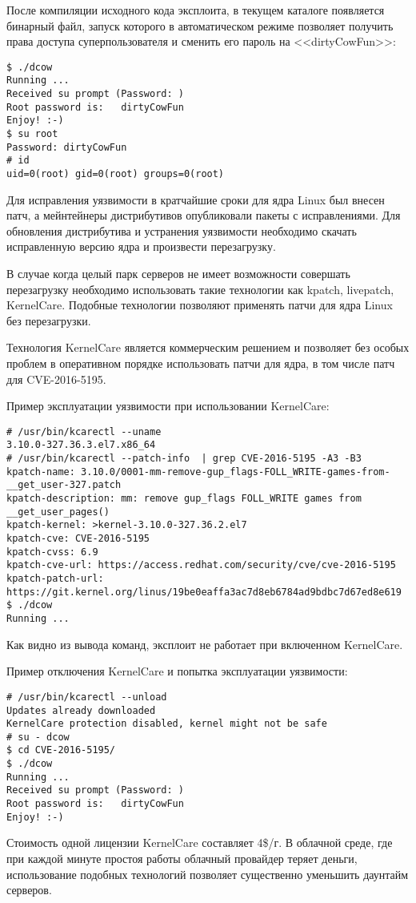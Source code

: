 После компиляции исходного кода эксплоита, в текущем каталоге появляется бинарный файл, запуск которого в автоматическом режиме позволяет получить права доступа суперпользователя и сменить его пароль на <<dirtyCowFun>>:
\begin{lstlisting}
$ ./dcow
Running ...
Received su prompt (Password: )
Root password is:   dirtyCowFun
Enjoy! :-)
$ su root
Password: dirtyCowFun
# id
uid=0(root) gid=0(root) groups=0(root)
\end{lstlisting}

Для исправления уязвимости в кратчайшие сроки для ядра Linux был внесен патч, а мейнтейнеры дистрибутивов опубликовали пакеты с исправлениями.
Для обновления дистрибутива и устранения уязвимости необходимо скачать исправленную версию ядра и произвести перезагрузку.

В случае когда целый парк серверов не имеет возможности совершать перезагрузку необходимо использовать такие технологии как kpatch, livepatch, KernelCare.
Подобные технологии позволяют применять патчи для ядра Linux без перезагрузки.

Технология KernelCare является коммерческим решением и позволяет без особых проблем в оперативном порядке использовать патчи для ядра, в том числе патч для CVE-2016-5195.

Пример эксплуатации уязвимости при использовании KernelCare:

\begin{lstlisting}
# /usr/bin/kcarectl --uname
3.10.0-327.36.3.el7.x86_64
# /usr/bin/kcarectl --patch-info  | grep CVE-2016-5195 -A3 -B3
kpatch-name: 3.10.0/0001-mm-remove-gup_flags-FOLL_WRITE-games-from-__get_user-327.patch
kpatch-description: mm: remove gup_flags FOLL_WRITE games from __get_user_pages()
kpatch-kernel: >kernel-3.10.0-327.36.2.el7
kpatch-cve: CVE-2016-5195
kpatch-cvss: 6.9
kpatch-cve-url: https://access.redhat.com/security/cve/cve-2016-5195
kpatch-patch-url: https://git.kernel.org/linus/19be0eaffa3ac7d8eb6784ad9bdbc7d67ed8e619
$ ./dcow
Running ...
\end{lstlisting}

Как видно из вывода команд, эксплоит не работает при включенном KernelCare.

Пример отключения KernelCare и попытка эксплуатации уязвимости:
\begin{lstlisting}
# /usr/bin/kcarectl --unload
Updates already downloaded
KernelCare protection disabled, kernel might not be safe
# su - dcow
$ cd CVE-2016-5195/
$ ./dcow
Running ...
Received su prompt (Password: )
Root password is:   dirtyCowFun
Enjoy! :-)
\end{lstlisting}

Стоимость одной лицензии KernelCare составляет 4\$/г.
В облачной среде, где при каждой минуте простоя работы облачный провайдер теряет деньги, использование подобных технологий позволяет существенно уменьшить даунтайм серверов.

\clearpage
